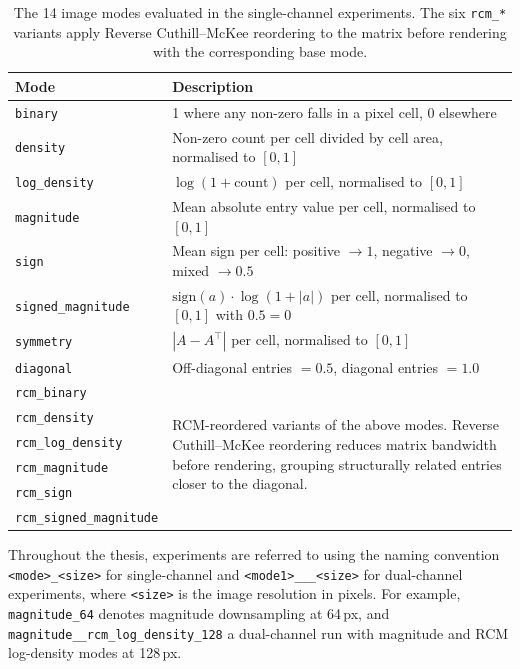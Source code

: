 \begin{table}[h]
  \centering
  \caption[The 14 image modes evaluated in the single-channel experiments.]{The 14 image modes evaluated in the single-channel experiments. The six \texttt{rcm\_*} variants apply Reverse Cuthill--McKee reordering to the matrix before rendering with the corresponding base mode.}
  \label{tab:image-modes}
  \begin{tabular}{lp{8.5cm}}
    \toprule
    \textbf{Mode} & \textbf{Description} \\
    \midrule
    \texttt{binary}           & 1 where any non-zero falls in a pixel cell, 0 elsewhere \\
    \texttt{density}          & Non-zero count per cell divided by cell area, normalised to $[0,1]$ \\
    \texttt{log\_density}     & $\log(1 + \text{count})$ per cell, normalised to $[0,1]$ \\
    \texttt{magnitude}        & Mean absolute entry value per cell, normalised to $[0,1]$ \\
    \texttt{sign}             & Mean sign per cell: positive $\to 1$, negative $\to 0$, mixed $\to 0.5$ \\
    \texttt{signed\_magnitude}& $\text{sign}(a) \cdot \log(1+|a|)$ per cell, normalised to $[0,1]$ with $0.5 = 0$ \\
    \texttt{symmetry}         & $|A - A^\top|$ per cell, normalised to $[0,1]$ \\
    \texttt{diagonal}         & Off-diagonal entries $= 0.5$, diagonal entries $= 1.0$ \\
    \midrule
    \texttt{rcm\_binary}           & \multirow{6}{*}{\parbox{8.5cm}{RCM-reordered variants of the above modes. Reverse Cuthill--McKee reordering reduces matrix bandwidth before rendering, grouping structurally related entries closer to the diagonal.}} \\
    \texttt{rcm\_density}          & \\
    \texttt{rcm\_log\_density}     & \\
    \texttt{rcm\_magnitude}        & \\
    \texttt{rcm\_sign}             & \\
    \texttt{rcm\_signed\_magnitude}& \\
    \bottomrule
  \end{tabular}
\end{table}

Throughout the thesis, experiments are referred to using the naming convention
\texttt{<mode>\_<size>} for single-channel and \texttt{<mode1>\_\_<mode2>\_<size>} for dual-channel experiments,
where \texttt{<size>} is the image resolution in pixels.
For example, \texttt{magnitude\_64} denotes magnitude downsampling at 64\,px,
and \texttt{magnitude\_\_rcm\_log\_density\_128} a dual-channel run with magnitude and
RCM log-density modes at 128\,px.

